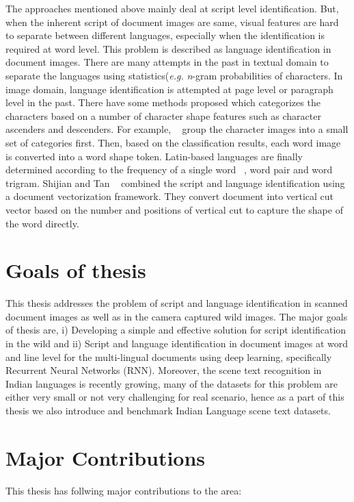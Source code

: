 The approaches mentioned above mainly deal at script level identification. But, when the inherent script of document images are same, visual features are hard to separate between different languages, especially when the identification is required at word level. This problem is described as language identification in document images. There are many attempts in the past in textual domain to separate the languages using statistics(\textit{e.g.} \textit{n}-gram probabilities of characters. In image domain, language identification is attempted at page level or paragraph level in the past. There have some methods proposed which
categorizes the characters based on a number of character shape features such as character ascenders and descenders. For example, ~\citep{Spitz97} group the character images into a small set of categories first. Then, based on the classification results, each word image is converted into a word shape token. Latin-based languages are finally determined according to the frequency of a single word ~\cite{Spitz97}, word pair and word trigram. Shijian and Tan ~\cite{Shijian08} combined the script and language identification using a document vectorization framework. They convert document into vertical cut vector based on the number and positions of vertical cut to capture the shape of the word directly.

\section{Goals of thesis}
This thesis addresses the problem of script and language identification in scanned document images as well as in the camera captured wild images.  The major goals of thesis are, i) Developing a simple and effective solution for script identification in the wild and ii) Script and language identification in document images at word and line level for the multi-lingual documents using deep learning, specifically Recurrent Neural Networks (\textsc{RNN}). Moreover, the scene text recognition in Indian languages is recently growing, many of the datasets for this problem are either very small or not very challenging for real scenario, hence as a part of this thesis we also introduce and benchmark Indian Language scene text datasets.


\section{Major Contributions}
This thesis has follwing major contributions to the area:

